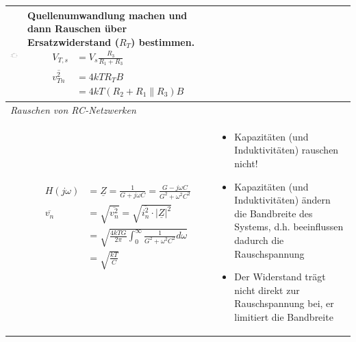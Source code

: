\begin{longtable}[t]{|p{4cm}|p{5.2cm}|p{7cm}|}
    \includegraphics[width=3cm]{pictures/seriewiderstand2.png}
    & {Quellenumwandlung machen und dann Rauschen über Ersatzwiderstand ($R_T$) bestimmen.\newline
       \begin{align*}
           V_{T,s}&=V_{s}\frac{R_{3}}{R_{1}+R_{3}}\\
           \overline{v^2_{Tn}}&=4kTR_{T}B\\
           &=4kT(R_{2}+R_{1}\parallel R_{3})B
       \end{align*}
      }
    & {
      }
    \\ \hline
    \multicolumn{3}{|l|}{\textit{Rauschen von RC-Netzwerken}}
    \\ \hdashline
    \begin{center}  \end{center}
    & { \vspace{-1.5\topsep}
        \begin{align*}
            H(j\omega) &= \underline{Z}=\frac{1}{G+j\omega C}=\frac{G-j\omega C}{G^2+\omega^2C^2}\\
            \overline{v_{n}} &=\sqrt{\overline{v^2_{n}}} = \sqrt{\overline{i_n^2} \cdot |\underline{Z}|^2}\\ &=\sqrt{\frac{4kTG}{2\pi}\int^{\infty}_{0}\frac{1}{G^2+\omega^2C^2}d\omega}\\
            &=\sqrt{\frac{kT}{C}}            
        \end{align*}
      }
    & {\vspace{-1.5\topsep}
        \begin{itemize}[leftmargin=*]
            \item Kapazitäten (und Induktivitäten) rauschen nicht!
            \item Kapazitäten (und Induktivitäten) ändern die Bandbreite des Systems, d.h. beeinflussen dadurch die Rauschspannung
            \item Der Widerstand trägt nicht direkt zur Rauschspannung bei, er limitiert die Bandbreite
            \newline
        \end{itemize}
      }
    \\ \hline
\end{longtable}
